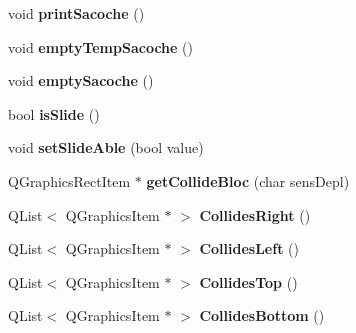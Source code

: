 \begin{DoxyCompactItemize}
\item 
\hypertarget{class_pingouin_a736f73e55524b59c00479aef1f91f94d}{}void {\bfseries print\+Sacoche} ()\label{class_pingouin_a736f73e55524b59c00479aef1f91f94d}

\item 
\hypertarget{class_pingouin_a1adb59f85236324915f9211bc111faa6}{}void {\bfseries empty\+Temp\+Sacoche} ()\label{class_pingouin_a1adb59f85236324915f9211bc111faa6}

\item 
\hypertarget{class_pingouin_af53b1d8d5167cd2fc039f97219f22064}{}void {\bfseries empty\+Sacoche} ()\label{class_pingouin_af53b1d8d5167cd2fc039f97219f22064}

\item 
\hypertarget{class_pingouin_a31dcd728180d2e85cf1c696ad2f0b062}{}bool {\bfseries is\+Slide} ()\label{class_pingouin_a31dcd728180d2e85cf1c696ad2f0b062}

\item 
\hypertarget{class_pingouin_aecce86d070fcfef325a55676043866ab}{}void {\bfseries set\+Slide\+Able} (bool value)\label{class_pingouin_aecce86d070fcfef325a55676043866ab}

\item 
\hypertarget{class_pingouin_ad571ffa2df0cdb3a6381bd24ec1363eb}{}Q\+Graphics\+Rect\+Item $\ast$ {\bfseries get\+Collide\+Bloc} (char sens\+Depl)\label{class_pingouin_ad571ffa2df0cdb3a6381bd24ec1363eb}

\item 
\hypertarget{class_pingouin_ab65df246ceda4f50ec939faeb55a9550}{}Q\+List$<$ Q\+Graphics\+Item $\ast$ $>$ {\bfseries Collides\+Right} ()\label{class_pingouin_ab65df246ceda4f50ec939faeb55a9550}

\item 
\hypertarget{class_pingouin_a4775b4894d8b8165c778019de8df2d15}{}Q\+List$<$ Q\+Graphics\+Item $\ast$ $>$ {\bfseries Collides\+Left} ()\label{class_pingouin_a4775b4894d8b8165c778019de8df2d15}

\item 
\hypertarget{class_pingouin_aa81d4eaddce1ef53808d6d4978d1b132}{}Q\+List$<$ Q\+Graphics\+Item $\ast$ $>$ {\bfseries Collides\+Top} ()\label{class_pingouin_aa81d4eaddce1ef53808d6d4978d1b132}

\item 
\hypertarget{class_pingouin_af7dbd1097ef3d4cf4911d006fa67f06e}{}Q\+List$<$ Q\+Graphics\+Item $\ast$ $>$ {\bfseries Collides\+Bottom} ()\label{class_pingouin_af7dbd1097ef3d4cf4911d006fa67f06e}


\end{DoxyCompactItemize}
